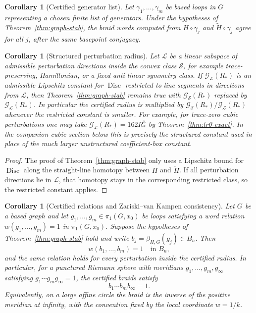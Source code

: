 \documentclass[11pt]{article}
\newtheorem{corollary}[theorem]{Corollary}
\numberwithin{equation}{section}
\DeclareMathOperator{\Disc}{Disc}
\newcommand{\wt}[1]{\widetilde{#1}}
\begin{document}
\begin{corollary}[Certified generator list]
Let $\gamma_1,\ldots,\gamma_m$ be based loops in $G$ representing a chosen
finite list of generators.  Under the hypotheses of
Theorem~\ref{thm:graph-stab}, the braid words computed from
$H\circ\gamma_j$ and $\wt H\circ\gamma_j$ agree for all $j$, after the same
basepoint conjugacy.
\end{corollary}


\begin{corollary}[Structured perturbation radius]\label{cor:structured-radius}
Let \(\mathcal L\) be a linear subspace of admissible perturbation directions
inside the convex class \(\mathcal S\), for example trace-preserving,
Hamiltonian, or a fixed anti-linear symmetry class.  If
\(\mathcal G_{\mathcal L}(R_*)\) is an admissible Lipschitz constant for
\(\Disc\) restricted to line segments in directions from \(\mathcal L\), then
Theorem~\ref{thm:graph-stab} remains true with
\(\mathcal G_{\mathcal S}(R_*)\) replaced by
\(\mathcal G_{\mathcal L}(R_*)\).  In particular the certified radius is
multiplied by
\(\mathcal G_{\mathcal S}(R_*)/\mathcal G_{\mathcal L}(R_*)\) whenever the
restricted constant is smaller.
For example, for trace-zero cubic perturbations one may take
\(\mathcal G_{\mathcal L}(R_*)=162R_*^5\) by
Theorem~\ref{thm:tr0-exact}.  In the companion cubic section below this is
precisely the structured constant used in place of the much larger
unstructured coefficient-box constant.
\end{corollary}

\begin{proof}
The proof of Theorem~\ref{thm:graph-stab} only uses a Lipschitz bound for
\(\Disc\) along the straight-line homotopy between \(H\) and \(\widetilde H\).
If all perturbation directions lie in \(\mathcal L\), that homotopy stays in
the corresponding restricted class, so the restricted constant applies.
\end{proof}

\begin{corollary}[Certified relations and Zariski--van Kampen consistency]\label{thm:certified-relations}
Let \(G\) be a based graph and let
\(g_1,\ldots,g_m\in\pi_1(G,x_0)\) be loops satisfying a word relation
\(w(g_1,\ldots,g_m)=1\) in \(\pi_1(G,x_0)\).  Suppose the hypotheses of
Theorem~\ref{thm:graph-stab} hold and write
\(b_j=\beta_{H,G}(g_j)\in B_n\).  Then
\[
  w(b_1,\ldots,b_m)=1\quad\text{in }B_n,
\]
and the same relation holds for every perturbation inside the certified
radius.  In particular, for a punctured Riemann sphere with meridians
\(g_1,\ldots,g_m,g_\infty\) satisfying
\(g_1\cdots g_m g_\infty=1\), the certified braids satisfy
\[
  b_1\cdots b_m b_\infty=1.
\]
Equivalently, on a large affine circle the braid is the inverse of the
positive meridian at infinity, with the convention fixed by the local
coordinate \(w=1/k\).
\end{corollary}
\end{document}
